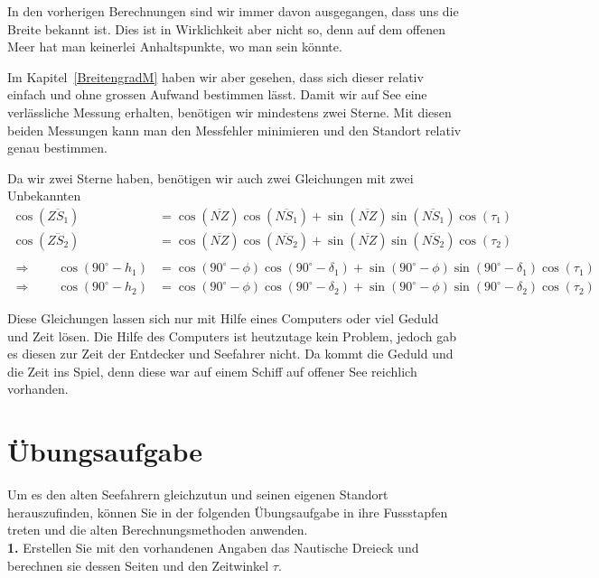 \begin{refsection}
In den vorherigen Berechnungen sind wir immer davon ausgegangen, dass uns die Breite bekannt ist. Dies ist in Wirklichkeit aber nicht so, denn auf dem offenen Meer hat man keinerlei Anhaltspunkte, wo man sein könnte.

Im Kapitel~\ref{BreitengradM}  haben wir aber gesehen, dass sich dieser relativ einfach und ohne grossen Aufwand bestimmen lässt. Damit wir auf See eine verlässliche Messung erhalten, benötigen wir mindestens zwei Sterne. Mit diesen beiden Messungen kann man den Messfehler minimieren und den Standort relativ genau bestimmen.

Da wir zwei Sterne haben, benötigen wir auch zwei Gleichungen mit zwei Unbekannten
\begin{align*}
\cos(\overline{ZS_1}) &= \cos(\overline{NZ}) \cos(\overline{NS_1}) + \sin(\overline{NZ}) \sin(\overline{NS_1}) \cos(\tau_1) \\
\cos(\overline{ZS_2}) &= \cos(\overline{NZ}) \cos(\overline{NS_2}) + \sin(\overline{NZ}) \sin(\overline{NS_2}) \cos(\tau_2) \\
\\
\Rightarrow \quad \quad
\cos(90^{\circ} - h_1) &= \cos(90^{\circ} - \phi) \cos(90^{\circ} - \delta_1) + \sin(90^{\circ} - \phi)\sin(90^{\circ} - \delta_1) \cos(\tau_1) \\
\Rightarrow \quad \quad
\cos(90^{\circ} - h_2) &= \cos(90^{\circ} - \phi) \cos(90^{\circ} - \delta_2) + \sin(90^{\circ} - \phi)\sin(90^{\circ} - \delta_2) \cos(\tau_2)
\end{align*}

Diese Gleichungen lassen sich nur mit Hilfe eines Computers oder viel Geduld und Zeit lösen. Die Hilfe des Computers ist heutzutage kein Problem, jedoch gab es diesen zur Zeit der Entdecker und Seefahrer nicht. Da kommt die Geduld und die Zeit ins Spiel, denn diese war auf einem Schiff auf offener See reichlich vorhanden.


\section{Übungsaufgabe}
Um es den alten Seefahrern gleichzutun und seinen eigenen Standort herauszufinden, können Sie in der folgenden Übungsaufgabe in ihre Fussstapfen treten und die alten Berechnungsmethoden anwenden. \\

\textbf{1.} Erstellen Sie mit den vorhandenen Angaben das Nautische Dreieck und berechnen sie dessen Seiten und den Zeitwinkel $\tau$.


\end{refsection}

